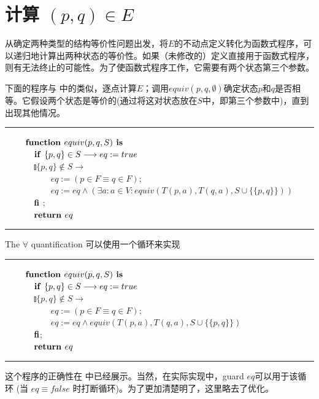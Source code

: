 \section{计算 $ (p,q) \in E $}

从确定两种类型的结构等价性问题出发，将$E$的不动点定义转化为函数式程序，可以递归地计算出两种状态的等价性。如果（未修改的）定义直接用于函数式程序，则有无法终止的可能性。为了使函数式程序工作，它需要有两个状态第三个参数。

下面的程序与 \cite{t-Ei91} 中的类似，逐点计算$E$；调用$equiv(p,q,\emptyset)$确定状态$p$和$q$是否相等。它假设两个状态是等价的(通过将这对状态放在$S$中，即第三个参数中)，直到出现其他情况。
\newline
\rule{\textwidth}{1pt}
\mbox{　　} $\mbox{\textbf{function }} equiv (p,q,S) \mbox{\textbf{ is }}$ \\
\mbox{　　　} $ \mbox{\textbf{if }} \{ p,q \} \in S \longrightarrow eq := true $ \\
\mbox{　　　} $ \talloblong \{ p,q \} \not\in S \longrightarrow $ \\
\mbox{　　　　　} $ eq := ( p \in F \equiv q \in F ) $; \\
\mbox{　　　　　} $ eq := eq \land (\exists a:a \in V : equiv (T(p,a),T(q,a),S \cup \{ \{ p,q\} \}  ) )  $ \\
\mbox{　　　} $\mbox{\textbf{fi}}$ ;\\
\mbox{　　　} $\mbox{\textbf{return }} eq$ \\
\rule{\textwidth}{1pt}
The $\forall$ quantification 可以使用一个循环来实现
\newline
\rule{\textwidth}{1pt}
\mbox{　　} $\mbox{\textbf{function }} equiv (p,q,S) \mbox{\textbf{ is }}$ \\
\mbox{　　　} $ \mbox{\textbf{if }} \{ p,q \} \in S \longrightarrow eq := true $ \\
\mbox{　　　} $ \talloblong \{ p,q \} \not\in S \longrightarrow $ \\
\mbox{　　　　　} $ eq := ( p \in F \equiv q \in F ) $; \\
\mbox{　　　　　} $ eq := eq \land equiv (T(p,a),T(q,a),S \cup \{ \{ p,q\} \}  )   $ \\
\mbox{　　　} $\mbox{\textbf{fi}}$; \\
\mbox{　　　} $\mbox{\textbf{return }} eq$ \\
\rule{\textwidth}{1pt}
这个程序的正确性在 \cite{t-Ei91} 中已经展示。当然，在实际实现中，guard $eq$可以用于该循环 (当 $eq \equiv false$ 时打断循环)。为了更加清楚明了，这里略去了优化。

